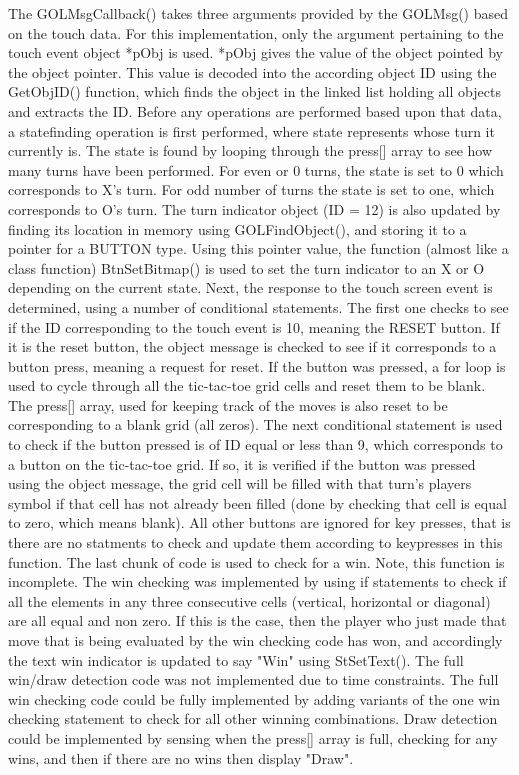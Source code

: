 \documentclass[12pt]{article}
\begin{document}
The GOLMsgCallback() takes three arguments provided by the GOLMsg() based on the touch data. For this implementation, only the argument pertaining to the touch event object *pObj is used. *pObj gives the value of the object pointed by the object pointer. This value is decoded into the according object ID using the GetObjID() function, which finds the object in the linked list holding all objects and extracts the ID. Before any operations are performed based upon that data, a statefinding operation is first performed, where state represents whose turn it currently is. The state is found by looping through the press[] array to see how many turns have been performed. For even or 0 turns, the state is set to 0 which corresponds to X's turn. For odd number of turns the state is set to one, which corresponds to O's turn. The turn indicator object (ID = 12) is also updated by finding its location in memory using GOLFindObject(), and storing it to a pointer for a BUTTON type. Using this pointer value, the function (almost like a class function) BtnSetBitmap() is used to set the turn indicator to an X or O depending on the current state. Next, the response to the touch screen event is determined, using a number of conditional statements. The first one checks to see if the ID corresponding to the touch event is 10, meaning the RESET button. If it is the reset button, the object message is checked to see if it corresponds to a button press, meaning a request for reset. If the button was pressed, a for loop is used to cycle through all the tic-tac-toe grid cells and reset them to be blank. The press[] array, used for keeping track of the moves is also reset to be corresponding to a blank grid (all zeros). The next conditional statement is used to check if the button pressed is of ID equal or less than 9, which corresponds to a button on the tic-tac-toe grid. If so, it is verified if the button was pressed using the object message, the grid cell will be filled with that turn's players symbol if that cell has not already been filled (done by checking that cell is equal to zero, which means blank).  All other buttons are ignored for key presses, that is there are no statments to check and update them according to keypresses in this function. The last chunk of code is used to check for a win. Note, this function is incomplete. The win checking was implemented by using if statements to check if all the elements in any three consecutive cells (vertical, horizontal or diagonal) are all equal and non zero. If this is the case, then the player who just made that move that is being evaluated by the win checking code has won, and accordingly the text win indicator is updated to say "Win" using StSetText(). The full win/draw detection code was not implemented due to time constraints. The full win checking code could be fully implemented by adding variants of the one win checking statement to check for all other winning combinations. Draw detection could be implemented by sensing when the press[] array is full, checking for any wins, and then if there are no wins then display "Draw".
\end{document}
